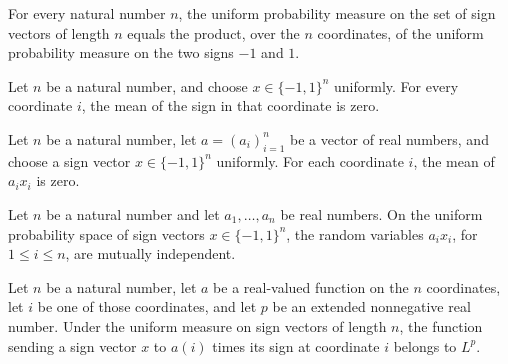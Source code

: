 \begin{theorem}
\label{FABL.twoDivPiRademacherMeasure_eq_pi}
\leanok
{}
For every natural number $n$, the uniform probability measure on the set of sign vectors
of length $n$ equals the product, over the $n$ coordinates, of the uniform probability
measure on the two signs $-1$ and $1$.
\end{theorem}

\begin{theorem}
\label{FABL.integral_twoDivPiSignCoordinate_eq_zero}
\leanok
{}
Let $n$ be a natural number, and choose $x\in\{-1,1\}^n$ uniformly. For every coordinate
$i$, the mean of the sign in that coordinate is zero.
\end{theorem}

\begin{theorem}
\label{FABL.integral_twoDivPiRademacherSummand_eq_zero}
\leanok
{}
Let $n$ be a natural number, let $a=(a_i)_{i=1}^n$ be a vector of real numbers, and
choose a sign vector $x\in\{-1,1\}^n$ uniformly. For each coordinate $i$, the mean of
$a_i x_i$ is zero.
\end{theorem}

\begin{theorem}
\label{FABL.twoDivPiRademacherSummands_iIndep}
\leanok
{}
Let $n$ be a natural number and let $a_1,\dots,a_n$ be real numbers. On the uniform
probability space of sign vectors $x\in\{-1,1\}^n$, the random variables $a_i x_i$, for
$1\le i\le n$, are mutually independent.
\end{theorem}

\begin{theorem}
\label{FABL.twoDivPiRademacherSummand_memLp}
\leanok
{}
Let $n$ be a natural number, let $a$ be a real-valued function on the $n$ coordinates,
let $i$ be one of those coordinates, and let $p$ be an extended nonnegative real number.
Under the uniform measure on sign vectors of length $n$, the function sending a sign
vector $x$ to $a(i)$ times its sign at coordinate $i$ belongs to $L^p$.
\end{theorem}


